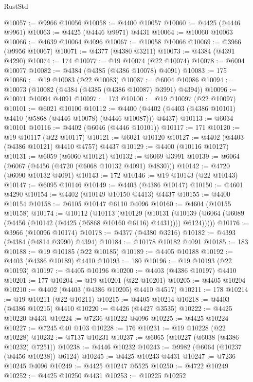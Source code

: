\begin{lexlean}{RustStd}
\begin{coremodule}
@10057 := @9966 @10056
@10058 := @4400 @10057
@10060 := @4425 (@4446 @9961)
@10063 := @4425 (@4446 @9971) @4431
@10064 := @10060 @10063
@10066 := @4639 @10064 @4096
@10067 := @10058 @10066
@10069 := @3966 (@9956 @10067)
@10071 := @4377 (@4380 @3211)
@10073 := @4384 (@4391 @4290)
@10074 := 174
@10077 := @19 @10074 (@22 @10074)
@10078 := @6004 @10077
@10082 := @4384 (@4385 (@4386 @10078) @4091)
@10083 := 175
@10086 := @19 @10083 (@22 @10083)
@10087 := @6004 @10086
@10094 := @10073 (@10082 (@4384 (@4385 (@4386 @10087) @3991) @4394))
@10096 := @10071 @10094 @4091
@10097 := 173
@10100 := @19 @10097 (@22 @10097)
@10101 := @6021 @10100
@10112 := @4400 (@4402 (@4403 (@4386 @10101) @4410 (@5868 (@4446 @10078) (@4446 @10087))) @4437)
@10113 := @6034 @10101
@10116 := @4402 (@6046 (@4446 @10101))
@10117 := 171
@10120 := @19 @10117 (@22 @10117)
@10121 := @6021 @10120
@10127 := @4402 (@4403 (@4386 @10121) @4410 @4757) @4437
@10129 := @4400 (@10116 @10127)
@10131 := @6059 (@6060 @10121)
@10132 := @6069 @3991
@10139 := @6064 (@6067 (@4456 (@4720 (@6068 @10132 @4091) @4830)))
@10142 := @4720 (@6090 @10132 @4091)
@10143 := 172
@10146 := @19 @10143 (@22 @10143)
@10147 := @6095 @10146
@10149 := @4403 (@4386 @10147)
@10150 := @4601 @4290
@10154 := @4402 (@10149 @10150 @4413) @4437
@10155 := @4400 @10154
@10158 := @6105 @10147 @6110 @4096
@10160 := @4604 (@10155 @10158)
@10174 := @10112
    (@10113
      (@10129
        (@10131
          (@10139 (@6064 (@6089 (@4456 (@10142 (@4425 (@5868 @10160 @6116) @4431)))) @6124)))))
@10176 := @3966 (@10096 @10174)
@10178 := @4377 (@4380 @3216)
@10182 := @4393 (@4384 (@4814 @3990) @4394)
@10184 := @10178 @10182 @4091
@10185 := 183
@10188 := @19 @10185 (@22 @10185)
@10189 := @4405 @10188
@10192 := @4403 (@4386 @10189) @4410
@10193 := 180
@10196 := @19 @10193 (@22 @10193)
@10197 := @4405 @10196
@10200 := @4403 (@4386 @10197) @4410
@10201 := 177
@10204 := @19 @10201 (@22 @10201)
@10205 := @4405 @10204
@10210 := @4402 (@4403 (@4386 @10205) @4410 @4517)
@10211 := 178
@10214 := @19 @10211 (@22 @10211)
@10215 := @4405 @10214
@10218 := @4403 (@4386 @10215) @4410
@10220 := @4426 (@4427 @3535)
@10222 := @4425 @10220 @4431
@10224 := @7236 @10222 @4096
@10225 := @4425 @10224
@10227 := @7245 @40 @103
@10228 := 176
@10231 := @19 @10228 (@22 @10228)
@10232 := @7137 @10231
@10237 := @6065 (@10227 (@6038 (@4386 @10232) @7251))
@10238 := @4446 @10232
@10243 := @9982 (@6064 (@10237 (@4456 @10238)) @6124)
@10245 := @4425 @10243 @4431
@10247 := @7236 @10245 @4096
@10249 := @4425 @10247 @5525
@10250 := @4722 @10249
@10252 := @4425 @10250 @4431
@10253 := @10225 @10252

\end{coremodule}
\end{lexlean}
